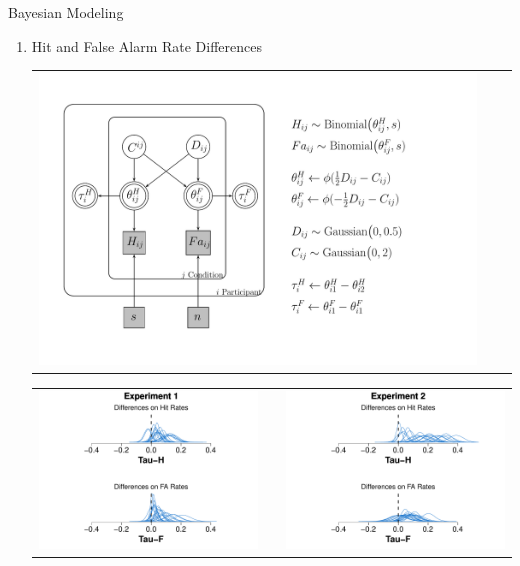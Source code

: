 \documentclass[final]{beamer}
\newlength{\onecolwid}
\newlength{\twocolwid}
\begin{document}
\begin{frame}[t]
\begin{columns}[t]
\begin{column}{\twocolwid}
\begin{columns}[t,totalwidth=\twocolwid]
\begin{column}{\onecolwid}
\begin{alertblock}{Bayesian Modeling}
\begin{enumerate}
\item Hit and False Alarm Rate Differences
\begin{center}
\begin{tabular}{ccc}
\includegraphics[width=0.65\linewidth]{Figures/Tau_DiffTeta_Model3.pdf}
\end{tabular}


\begin{tabular}{ccc}
\includegraphics[width=0.48\linewidth]{Figures/Tau_1.pdf} & \hfill & \includegraphics[width=0.48\linewidth]{Figures/Tau_2.pdf}
\end{tabular}
\end{center}



$\quad$
\end{enumerate}


\end{alertblock}
\end{column}
\end{columns}
\end{column}
\end{columns}
\end{frame}
\end{document}
